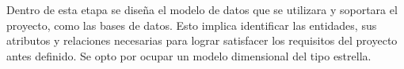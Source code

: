 Dentro de esta etapa se diseña el modelo de datos que se utilizara y soportara el proyecto, como las bases de datos. Esto implica identificar las entidades, sus atributos y relaciones necesarias para lograr satisfacer los requisitos del proyecto antes definido. Se opto por ocupar un modelo dimensional del tipo estrella.
